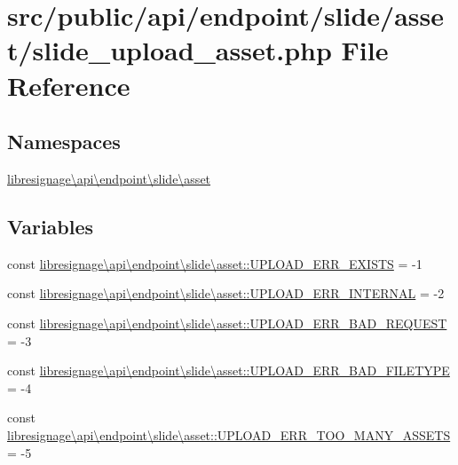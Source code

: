 \hypertarget{src_2public_2api_2endpoint_2slide_2asset_2slide__upload__asset_8php}{}\section{src/public/api/endpoint/slide/asset/slide\+\_\+upload\+\_\+asset.php File Reference}
\label{src_2public_2api_2endpoint_2slide_2asset_2slide__upload__asset_8php}
\subsection*{Namespaces}
\begin{DoxyCompactItemize}
\item 
 \hyperlink{namespacelibresignage_1_1api_1_1endpoint_1_1slide_1_1asset}{libresignage\textbackslash{}api\textbackslash{}endpoint\textbackslash{}slide\textbackslash{}asset}
\end{DoxyCompactItemize}
\subsection*{Variables}
\begin{DoxyCompactItemize}
\item 
const \hyperlink{namespacelibresignage_1_1api_1_1endpoint_1_1slide_1_1asset_afc32bfc0e78ad6a761685aff9d0f1809}{libresignage\textbackslash{}api\textbackslash{}endpoint\textbackslash{}slide\textbackslash{}asset\+::\+U\+P\+L\+O\+A\+D\+\_\+\+E\+R\+R\+\_\+\+E\+X\+I\+S\+TS} = -\/1
\item 
const \hyperlink{namespacelibresignage_1_1api_1_1endpoint_1_1slide_1_1asset_a0d1e56bfad2c1a2132a4f3e23050983b}{libresignage\textbackslash{}api\textbackslash{}endpoint\textbackslash{}slide\textbackslash{}asset\+::\+U\+P\+L\+O\+A\+D\+\_\+\+E\+R\+R\+\_\+\+I\+N\+T\+E\+R\+N\+AL} = -\/2
\item 
const \hyperlink{namespacelibresignage_1_1api_1_1endpoint_1_1slide_1_1asset_a347dbb92e7094848d6b67477471431f9}{libresignage\textbackslash{}api\textbackslash{}endpoint\textbackslash{}slide\textbackslash{}asset\+::\+U\+P\+L\+O\+A\+D\+\_\+\+E\+R\+R\+\_\+\+B\+A\+D\+\_\+\+R\+E\+Q\+U\+E\+ST} = -\/3
\item 
const \hyperlink{namespacelibresignage_1_1api_1_1endpoint_1_1slide_1_1asset_a11462e6b8d458961fbfde1d8c1bf0b8c}{libresignage\textbackslash{}api\textbackslash{}endpoint\textbackslash{}slide\textbackslash{}asset\+::\+U\+P\+L\+O\+A\+D\+\_\+\+E\+R\+R\+\_\+\+B\+A\+D\+\_\+\+F\+I\+L\+E\+T\+Y\+PE} = -\/4
\item 
const \hyperlink{namespacelibresignage_1_1api_1_1endpoint_1_1slide_1_1asset_ac3f206ae3a66f2d8b53038412b62108c}{libresignage\textbackslash{}api\textbackslash{}endpoint\textbackslash{}slide\textbackslash{}asset\+::\+U\+P\+L\+O\+A\+D\+\_\+\+E\+R\+R\+\_\+\+T\+O\+O\+\_\+\+M\+A\+N\+Y\+\_\+\+A\+S\+S\+E\+TS} = -\/5
\end{DoxyCompactItemize}


